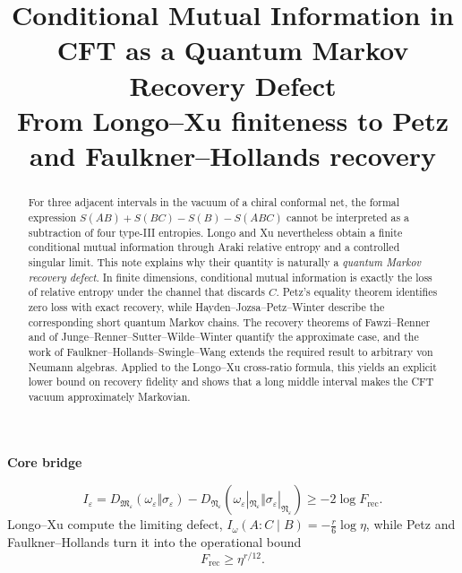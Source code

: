 \documentclass[11pt]{article}
\title{\vspace{-1.7cm}\color{navy}\bfseries
Conditional Mutual Information in CFT as a Quantum Markov Recovery Defect\\[0.35em]
\large From Longo--Xu finiteness to Petz and Faulkner--Hollands recovery}
\author{}
\date{}
\theoremstyle{accenttheorem}
\theoremstyle{definition}
\newcommand{\cM}{\mathfrak{M}}
\newcommand{\cN}{\mathfrak{N}}
\newcommand{\CMI}{I}
\newcommand{\eps}{\varepsilon}
\newcommand{\1}{\mathbf{1}}
\begin{document}
\maketitle
\vspace{-1.5em}

\begin{abstract}
For three adjacent intervals in the vacuum of a chiral conformal net, the formal expression
\(S(AB)+S(BC)-S(B)-S(ABC)\) cannot be interpreted as a subtraction of four type-III entropies.  Longo and Xu nevertheless obtain a finite conditional mutual information through Araki relative entropy and a controlled singular limit.  This note explains why their quantity is naturally a \emph{quantum Markov recovery defect}.  In finite dimensions, conditional mutual information is exactly the loss of relative entropy under the channel that discards \(C\).  Petz's equality theorem identifies zero loss with exact recovery, while Hayden--Jozsa--Petz--Winter describe the corresponding short quantum Markov chains.  The recovery theorems of Fawzi--Renner and of Junge--Renner--Sutter--Wilde--Winter quantify the approximate case, and the work of Faulkner--Hollands--Swingle--Wang extends the required result to arbitrary von Neumann algebras.  Applied to the Longo--Xu cross-ratio formula, this yields an explicit lower bound on recovery fidelity and shows that a long middle interval makes the CFT vacuum approximately Markovian.
\end{abstract}

\vspace{1.2em}
\begin{center}
\begin{tcolorbox}[
  width=0.88\textwidth,
  enhanced,
  colback=lightblue!62,
  colframe=navy,
  boxrule=0.7pt,
  arc=1.8mm,
  left=5mm,right=5mm,top=3.5mm,bottom=3.5mm
]
\centering
{\color{navy}\bfseries Core bridge}\par\vspace{0.45em}
\[
 \CMI_\eps
 =D_{\cM_\eps}(\omega_\eps\Vert\sigma_\eps)
  -D_{\cN_\eps}(\omega_\eps|_{\cN_\eps}\Vert
                  \sigma_\eps|_{\cN_\eps})
 \ge -2\log F_{\mathrm{rec}}.
\]
Longo--Xu compute the limiting defect,
\(
 \CMI_\omega(A:C\mid B)=-\frac r6\log\eta
\),
while Petz and Faulkner--Hollands turn it into the operational bound
\[
 F_{\mathrm{rec}}\ge\eta^{r/12}.
\]
\end{tcolorbox}
\end{center}
\clearpage
\end{document}

